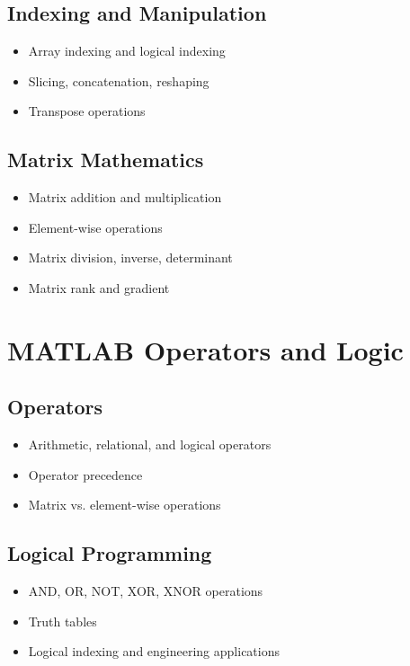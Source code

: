\documentclass[11pt, a4paper]{article}
\begin{document}
\subsection{Indexing and Manipulation}
\begin{itemize}
  \item Array indexing and logical indexing
  \item Slicing, concatenation, reshaping
  \item Transpose operations
\end{itemize}

\subsection{Matrix Mathematics}
\begin{itemize}
  \item Matrix addition and multiplication
  \item Element-wise operations
  \item Matrix division, inverse, determinant
  \item Matrix rank and gradient
\end{itemize}

\section{MATLAB Operators and Logic}

\subsection{Operators}
\begin{itemize}
  \item Arithmetic, relational, and logical operators
  \item Operator precedence
  \item Matrix vs. element-wise operations
\end{itemize}

\subsection{Logical Programming}
\begin{itemize}
  \item AND, OR, NOT, XOR, XNOR operations
  \item Truth tables
  \item Logical indexing and engineering applications
\end{itemize}
\end{document}
